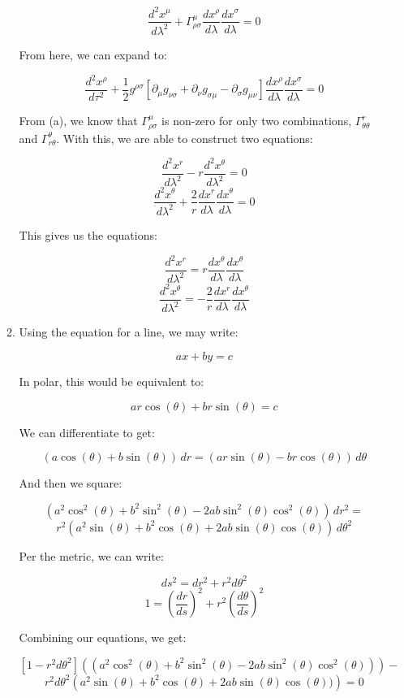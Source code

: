 \begin{enumerate}
\begin{enumerate}
        $$\frac{d^2x^{\mu}}{d\lambda^2}+\Gamma^{\mu}_{\rho\sigma}\frac{dx^{\rho}}{d\lambda}\frac{dx^{\sigma}}{d\lambda}=0$$

        From here, we can expand to:

        $$\frac{d^2x^{\rho}}{d\tau^2}+\frac{1}{2}g^{\rho\sigma}\left[  \partial_{\mu}g_{\nu\sigma}+\partial_{\nu}g_{\sigma\mu}-\partial_{\sigma}g_{\mu\nu} \right]\frac{dx^{\rho}}{d\lambda}\frac{dx^{\sigma}}{d\lambda}=0$$

        From (a), we know that $\Gamma^{\mu}_{\rho\sigma}$ is non-zero for only two combinations, $\Gamma^{r}_{\theta\theta}$ and $\Gamma^{\theta}_{r\theta}$. With this, we are able to construct two equations:

        $$\frac{d^2x^{r}}{d\lambda^2}-r\frac{d^2x^{\theta}}{d\lambda^2}=0$$
        $$\frac{d^2x^{\theta}}{d\lambda^2}+\frac{2}{r}\frac{dx^{r}}{d\lambda}\frac{dx^{\theta}}{d\lambda}=0$$

        This gives us the equations:

        $$\boxed{\frac{d^2x^{r}}{d\lambda^2}=r\frac{dx^{\theta}}{d\lambda}\frac{dx^{\theta}}{d\lambda}}$$
        $$\boxed{\frac{d^2x^{\theta}}{d\lambda^2}=-\frac{2}{r}\frac{dx^{r}}{d\lambda}\frac{dx^{\theta}}{d\lambda}}$$

      \item 

        Using the equation for a line, we may write:

        $$ax+by=c$$

        In polar, this would be equivalent to:

        $$ar\cos(\theta)+br\sin(\theta)=c$$

        We can differentiate to get:

        $$(a\cos(\theta)+b\sin(\theta))\,dr=(ar\sin(\theta)-br\cos(\theta))\,d\theta$$

        And then we square:

        $$(a^2\cos^2(\theta)+b^2\sin^2(\theta)-2ab\sin^2(\theta)\cos^2(\theta))\,dr^2=$$
        $$r^2(a^2\sin(\theta)+b^2\cos(\theta)+2ab\sin(\theta)\cos(\theta))\,d\theta^2$$

        Per the metric, we can write:

        $$ds^2=dr^2+r^2d\theta^2$$
        $$1=\left(\frac{dr}{ds}\right)^2+r^2\left(\frac{d\theta}{ds}\right)^2$$

        Combining our equations, we get:

        $$\left[1-r^2d\theta^2\right]\left( (a^2\cos^2(\theta)+b^2\sin^2(\theta)-2ab\sin^2(\theta)\cos^2(\theta)) \right)-$$
        $$r^2d\theta^2\left( a^2\sin(\theta)+b^2\cos(\theta)+2ab\sin(\theta)\cos(\theta)) \right)=0$$


\end{enumerate}
\end{enumerate}
